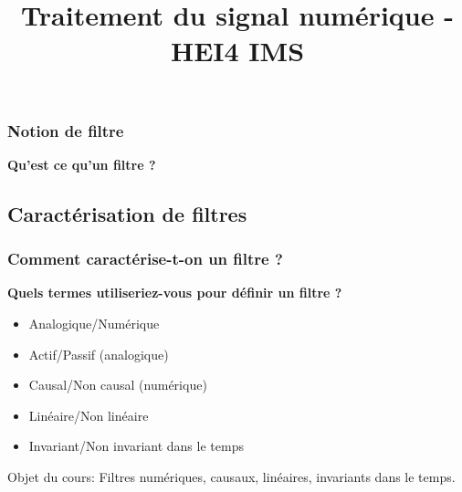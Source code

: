 \documentclass{beamer}
\title[Traitement du signal numérique]{Traitement du signal numérique - HEI4 IMS}
\author[Antony Bazir]{}
\begin{document}
\begin{frame}
\frametitle{Notion de filtre}
\textbf{Qu'est ce qu'un filtre ? }\\
{
\vspace{1 cm}
\begin{center}
\end{center}
}

\end{frame}

\subsection{Caractérisation de filtres}
\begin{frame}
\frametitle{Comment caractérise-t-on un filtre ?}
\textbf{Quels termes utiliseriez-vous pour définir un filtre ?}
\vspace{1cm}
\begin{itemize}
\item<2-> Analogique/Numérique
\vspace{0.2cm}
\item<3-> Actif/Passif (analogique)
\vspace{0.2cm}
\item<4-> Causal/Non causal (numérique)
\vspace{0.2cm}
\item<5-> Linéaire/Non linéaire 
\vspace{0.2cm}
\item<6-> Invariant/Non invariant dans le temps
\end{itemize}
{
\begin{block}{}
Objet du cours: Filtres numériques, causaux, linéaires, invariants dans le temps.
\end{block}
}
\end{frame}
\end{document}
